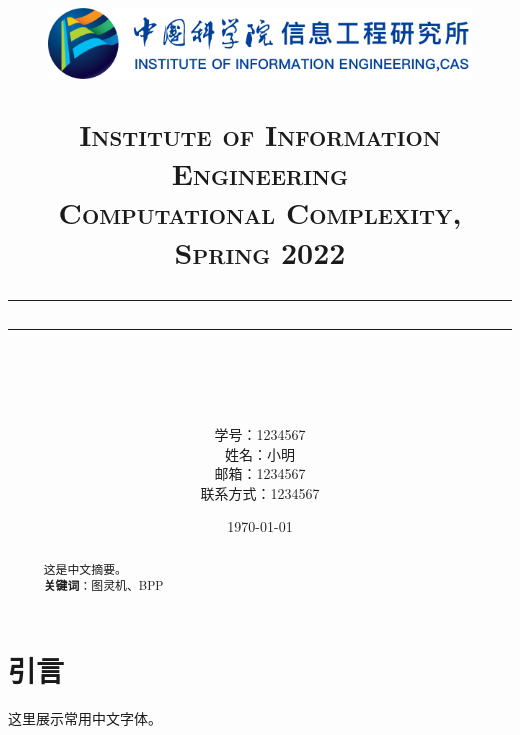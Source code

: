 \documentclass[a4paper, 12pt]{article}
\newcommand{\horrule}[1]{\rule[0.5ex]{\linewidth}{#1}} 	%
\begin{document}
\title{
    {
        \begin{figure}[htbp]
            \centering %
            \includegraphics[width = 0.7 \textwidth]{xgs_logo.png}
        \end{figure}
    }
    {
        \normalfont\normalsize\textsc{
            Institute of Information Engineering \\
            Computational Complexity, Spring 2022 \\
            [25pt]
        }
    }
    \horrule{0.5pt}
    \horrule{1.8pt} \\ [20pt]
}
\author{
    学号：1234567 \\ 
    姓名：小明 \\
    邮箱：1234567 \\
    联系方式：1234567 \\ [60pt]
}
\date{\today}

\begin{titlepage}
    \maketitle
    \vspace{30pt}
    \thispagestyle{empty} %
\end{titlepage}

\begin{abstract}
    \normalsize \ \ 这是中文摘要。 \\[5pt]
    \indent \ \ \textbf{关键词}：图灵机、BPP
\end{abstract}
\thispagestyle{empty} %
\newpage

\tableofcontents
\newpage
{}

\section{引言}
这里展示常用中文字体。
\end{document}

